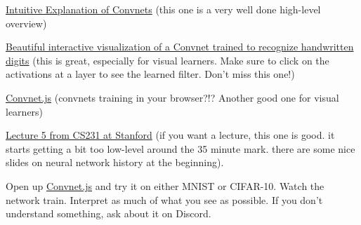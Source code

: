 \documentclass[assignment07_Solutions]{subfiles}
\begin{document}
\begin{externalresources}[(60 minutes)]
\bi
\item \href{https://ujjwalkarn.me/2016/08/11/intuitive-explanation-convnets/}{Intuitive Explanation of Convnets}  (this one is a very well done high-level overview)
\item \href{http://scs.ryerson.ca/~aharley/vis/conv/flat.html}{Beautiful interactive visualization of a Convnet trained to recognize handwritten digits} (this is great, especially for visual learners.  Make sure to click on the activations at a layer to see the learned filter.  Don't miss this one!)
\item \href{https://cs.stanford.edu/people/karpathy/convnetjs/}{Convnet.js} (convnets training in your browser?!? Another good one for visual learners)
\item \href{https://www.youtube.com/watch?v=bNb2fEVKeEo&list=PL3FW7Lu3i5JvHM8ljYj-zLfQRF3EO8sYv\&index=5}{Lecture 5 from CS231 at Stanford} (if you want a lecture, this one is good.  it starts getting a bit too low-level around the 35 minute mark.  there are some nice slides on neural network history at the beginning).
\ei
\end{externalresources}


\begin{exercise}[(15 minutes)]
Open up \href{https://cs.stanford.edu/people/karpathy/convnetjs/}{Convnet.js} and try it on either MNIST or CIFAR-10.  Watch the network train.  Interpret as much of what you see as possible.  If you don't understand something, ask about it on Discord.
\end{exercise}

\end{document}
